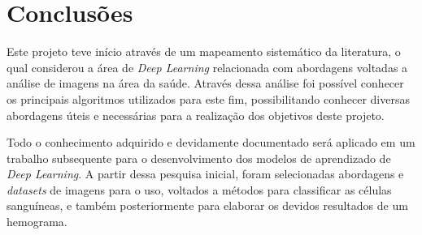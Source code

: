 \chapter{Conclusões}
\label{chap:conclusoes}



Este projeto teve início através de um mapeamento sistemático da literatura, o qual considerou a área de \emph{Deep Learning} relacionada com abordagens voltadas a análise de imagens na área da saúde. Através dessa análise foi possível conhecer os principais algoritmos utilizados para este fim, possibilitando conhecer diversas abordagens úteis e necessárias para a realização dos objetivos deste projeto.

Todo o conhecimento adquirido e devidamente documentado será aplicado em um trabalho subsequente para o desenvolvimento dos modelos de aprendizado de \emph{Deep Learning}. A partir dessa pesquisa inicial, foram selecionadas abordagens e \emph{datasets} de imagens para o uso, voltados a métodos para classificar as células sanguíneas, e também posteriormente para elaborar os devidos resultados de um hemograma.